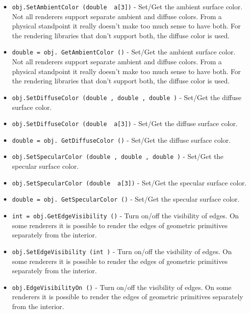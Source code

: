 \begin{itemize}
\item  \verb|obj.SetAmbientColor (double  a[3])| -  Set/Get the ambient surface color. Not all renderers support separate
 ambient and diffuse colors. From a physical standpoint it really
 doesn't make too much sense to have both. For the rendering
 libraries that don't support both, the diffuse color is used.

\item  \verb|double = obj. GetAmbientColor ()| -  Set/Get the ambient surface color. Not all renderers support separate
 ambient and diffuse colors. From a physical standpoint it really
 doesn't make too much sense to have both. For the rendering
 libraries that don't support both, the diffuse color is used.

\item  \verb|obj.SetDiffuseColor (double , double , double )| -  Set/Get the diffuse surface color.

\item  \verb|obj.SetDiffuseColor (double  a[3])| -  Set/Get the diffuse surface color.

\item  \verb|double = obj. GetDiffuseColor ()| -  Set/Get the diffuse surface color.

\item  \verb|obj.SetSpecularColor (double , double , double )| -  Set/Get the specular surface color.

\item  \verb|obj.SetSpecularColor (double  a[3])| -  Set/Get the specular surface color.

\item  \verb|double = obj. GetSpecularColor ()| -  Set/Get the specular surface color.

\item  \verb|int = obj.GetEdgeVisibility ()| -  Turn on/off the visibility of edges. On some renderers it is
 possible to render the edges of geometric primitives separately
 from the interior.

\item  \verb|obj.SetEdgeVisibility (int )| -  Turn on/off the visibility of edges. On some renderers it is
 possible to render the edges of geometric primitives separately
 from the interior.

\item  \verb|obj.EdgeVisibilityOn ()| -  Turn on/off the visibility of edges. On some renderers it is
 possible to render the edges of geometric primitives separately
 from the interior.


\end{itemize}
